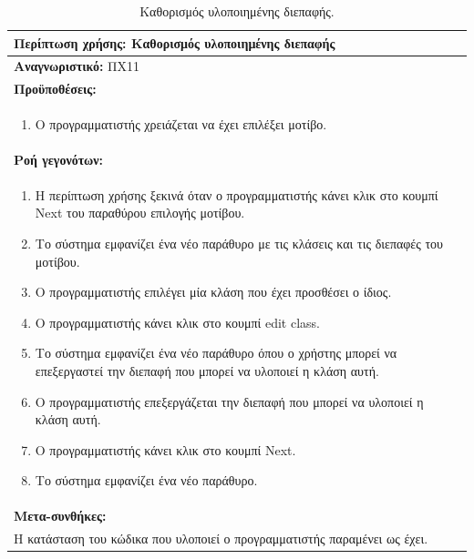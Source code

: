 \begin{table}[H]
	\hspace*{-0.2cm}
    \centering
    \scriptsize
	\begin{tabular}{|p{10cm}|}
	\hline
		\textbf{Περίπτωση χρήσης:} Καθορισμός υλοποιημένης διεπαφής  \\
	\hline
		\textbf{Αναγνωριστικό:} ΠΧ11 \\
	\hline	
		\textbf{Προϋποθέσεις:} \\
		\begin{enumerate}
		 \item Ο προγραμματιστής χρειάζεται να έχει επιλέξει μοτίβο.
		\end{enumerate} \\
	\hline
		\textbf{Ροή γεγονότων:} \\
		\begin{enumerate}
			\item Η περίπτωση χρήσης ξεκινά όταν ο προγραμματιστής κάνει κλικ στο κουμπί Next του παραθύρου επιλογής μοτίβου.
			\item Το σύστημα εμφανίζει ένα νέο παράθυρο με τις κλάσεις και τις διεπαφές του μοτίβου.
			\item Ο προγραμματιστής επιλέγει μία κλάση που έχει προσθέσει ο ίδιος.
			\item Ο προγραμματιστής κάνει κλικ στο κουμπί edit class.
			\item Το σύστημα εμφανίζει ένα νέο παράθυρο όπου ο χρήστης μπορεί να επεξεργαστεί την διεπαφή που μπορεί να υλοποιεί η κλάση αυτή.
			\item Ο προγραμματιστής επεξεργάζεται την διεπαφή που μπορεί να υλοποιεί η κλάση αυτή.
			\item Ο προγραμματιστής κάνει κλικ στο κουμπί Next.
			\item Το σύστημα εμφανίζει ένα νέο παράθυρο.
		\end{enumerate} \\
	\hline
		\textbf{Μετα-συνθήκες:} \\ Η κατάσταση του κώδικα που υλοποιεί ο προγραμματιστής παραμένει ως έχει. \\
	\hline
    \end{tabular}
    \caption{Καθορισμός υλοποιημένης διεπαφής.}
    \label{tab:setImplementedInterface}
\end{table}
\label{sec:useCases}